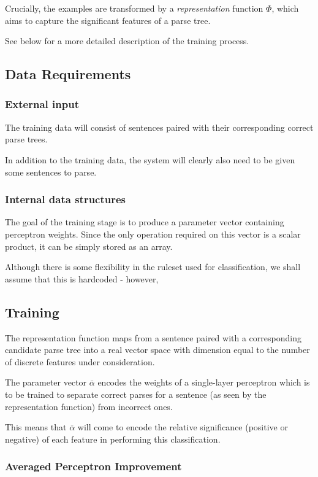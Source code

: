 \documentclass[11pt]{article}
\begin{document}
Crucially, the examples are transformed by a \emph{representation} function
$\Phi$, which aims to capture the significant features of a parse tree.

See below for a more detailed description of the training process.

\subsection*{Data Requirements}

\subsubsection*{External input}
The training data will consist of sentences paired with their corresponding
correct parse trees.

In addition to the training data, the system will clearly also need to be given
some sentences to parse.

\subsubsection*{Internal data structures}

The goal of the training stage is to produce a parameter vector containing
perceptron weights. Since the only operation required on this vector is a
scalar product, it can be simply stored as an array.

Although there is some flexibility in the ruleset used for classification, we
shall assume that this is hardcoded - however, 

\subsection*{Training}
The representation function maps from a sentence paired with a corresponding
candidate parse tree into a real vector space with dimension equal to the
number of discrete features under consideration.

The parameter vector $\bar{\alpha}$ encodes the weights of a single-layer
perceptron which is to be trained to separate correct parses for a sentence (as
seen by the representation function) from incorrect ones.

This means that $\bar{\alpha}$ will come to encode the relative significance
(positive or negative) of each feature in performing this classification.


\subsubsection*{Averaged Perceptron Improvement}
\end{document}
